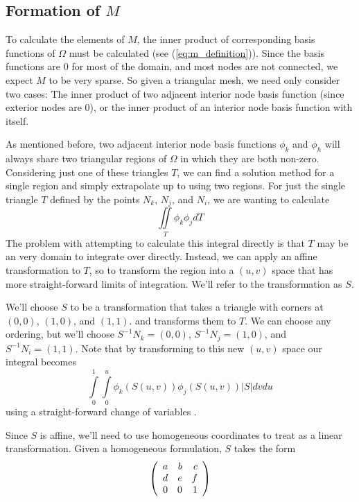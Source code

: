 \subsection{Formation of $M$}
To calculate the elements of $M$, the inner product of corresponding basis functions of $\Omega$ must be calculated
(see (\ref{eq:m_definition})). Since the basis functions are 0 for most of the domain, and most nodes are not
connected, we expect $M$ to be very sparse. So given a triangular mesh, we need only consider two cases: The inner
product of two adjacent interior node basis function (since exterior nodes are 0), or the inner product of an interior
node basis function with itself.

As mentioned before, two adjacent interior node basis functions $\phi_k$ and $\phi_h$ will always share two triangular
regions of $\Omega$ in which they are both non-zero. Considering just one of these triangles $T$, we can find a solution method for a
single region and simply extrapolate up to using two regions. For just the single triangle $T$ defined by the points
$N_k$, $N_j$, and $N_i$, we are wanting to calculate
\begin{equation}
\iint\limits_T \phi_k \phi_j dT
\end{equation}
The problem with attempting to calculate this integral directly is that $T$ may be an very domain to integrate over
directly. Instead, we can apply an affine transformation to $T$, so to transform the region into a $(u,v)$ space that
has more straight-forward limits of integration. We'll refer to the transformation as $S$.

We'll choose $S$ to be a transformation that takes a triangle with corners at $(0,0)$, $(1,0)$, and $(1,1)$. and
transforms them to $T$. We can choose any ordering, but we'll choose $S^{-1}N_k = (0, 0)$, $S^{-1}N_j = (1, 0)$,
and $S^{-1}N_i = (1, 1)$. Note that
by transforming to this new $(u,v)$ space our integral becomes
\begin{equation}
\int\limits_0^1 \int\limits_0^u \phi_k(S(u, v)) \phi_j(S(u, v)) |S| dv du
\end{equation}
using a straight-forward change of variables \cite{change_of_variables}.

Since $S$ is affine, we'll need to use homogeneous coordinates to treat as a linear transformation. Given a homogeneous
formulation, $S$ takes the form
\begin{equation}
\left(\begin{array}{rrrrrr}  a & b & c \\ d & e & f \\ 0 & 0 & 1  \\ \end{array} \right)
\end{equation}

